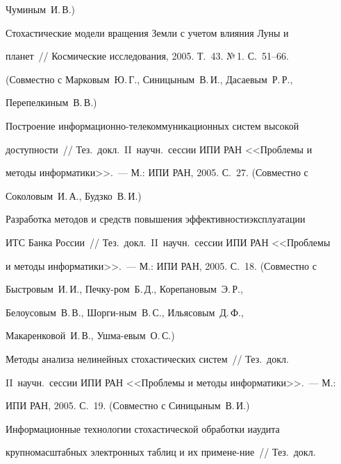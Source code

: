 Чуминым~И.\,В.)





 Стохастические модели вращения Земли с учетом влияния Луны и


планет~// Космические исследования, 2005. Т.~43. №\,1. С.~51--66.


(Совместно с Марковым~Ю.\,Г., Синицыным~В.\,И., Дасаевым~Р.\,Р.,


Перепелкиным~В.\,В.)





 Построение информационно-телекоммуникационных систем высокой


доступности~// Тез.\ докл.\ II~научн.\ сессии ИПИ РАН <<Проблемы и


методы информатики>>.~--- М.: ИПИ РАН, 2005. С.~27. (Совместно с


Соколовым~И.\,А., Будзко~В.\,И.)





 Разработка методов и средств повышения эффективности\linebreak эксплуатации


ИТС Банка России~// Тез.\ докл.\ II~научн.\ сессии ИПИ РАН <<Проблемы


и методы информатики>>.~--- М.: ИПИ РАН, 2005. С.~18. (Совместно с


Быстровым~И.\,И., Печку-\linebreak ром~Б.\,Д., Корепановым~Э.\,Р.,


Белоусовым~В.\,В., Шорги-\linebreak ным~В.\,С., Ильясовым~Д.\,Ф.,


Макаренковой~И.\,В., Ушма-\linebreak евым~О.\,С.)





 Методы анализа нелинейных стохастических систем~// Тез.\ докл.\


II~научн.\ сессии ИПИ РАН <<Проблемы и методы информатики>>.~--- М.:


ИПИ РАН, 2005. С.~19. (Совместно с Синицыным~В.\,И.)





 Информационные технологии стохастической обработки и\linebreak аудита


крупномасштабных электронных таблиц и их примене-\linebreak ние~// Тез.\ докл.\


